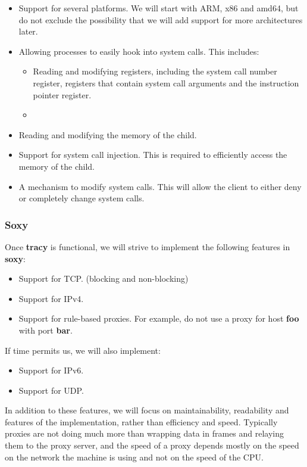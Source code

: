 \documentclass[a4paper]{article}
\begin{document}
\begin{itemize}
\item Support for several platforms. We will start with ARM, x86 and amd64, but
do not exclude the possibility that we will add support for more architectures
later.

\item Allowing processes to easily hook into system calls. This includes:
    \begin{itemize}
    \item Reading and modifying registers, including the system call number
    register, registers that contain system call arguments and the instruction
    pointer register.
    \item 
    \end{itemize}

\item Reading and modifying the memory of the child.

\item Support for system call injection. This is required to efficiently
access the memory of the child.

\item A mechanism to modify system calls. This will allow the client to
either deny or completely change system calls.
\end{itemize}

\subsubsection{Soxy}
Once \textbf{tracy} is functional, we will strive to implement the following
features in \textbf{soxy}:

\begin{itemize}
\item Support for TCP. (blocking and non-blocking)
\item Support for IPv4.
\item Support for rule-based proxies. For example, do not use a proxy for
host \textbf{foo} with port \textbf{bar}.
\end{itemize}

If time permits us, we will also implement:

\begin{itemize}
\item Support for IPv6.
\item Support for UDP.
\end{itemize}

In addition to these features, we will focus on maintainability, readability
and features of the implementation, rather than efficiency and speed.
Typically proxies are not doing much more than wrapping data in frames and
relaying them to the proxy server, and the speed of a proxy depends mostly
on the speed on the network the machine is using and not on the speed of
the CPU.
\end{document}
